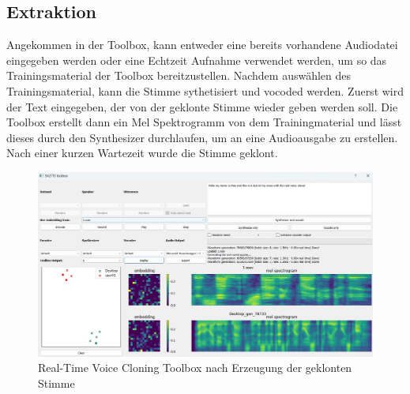 \subsection{Extraktion}
Angekommen in der Toolbox, kann entweder eine bereits vorhandene Audiodatei eingegeben werden oder eine Echtzeit Aufnahme verwendet werden, um so das Trainingsmaterial der Toolbox bereitzustellen. Nachdem auswählen des Trainingsmaterial, kann die Stimme sythetisiert und vocoded werden. Zuerst wird der Text eingegeben, der von der geklonte Stimme wieder geben werden soll. Die Toolbox erstellt dann ein Mel Spektrogramm von dem Trainingmaterial und lässt dieses durch den Synthesizer durchlaufen, um an eine Audioausgabe zu erstellen. Nach einer kurzen Wartezeit wurde die Stimme geklont.
\begin{figure}[H]
    \includegraphics[width=1.0\textwidth]{Bilder/AudioToolbox2}
    \centering
    \caption{Real-Time Voice Cloning Toolbox nach Erzeugung der geklonten Stimme}
    \label{fig:RTVCloningToolboxDurchfuehrung}
\end{figure}